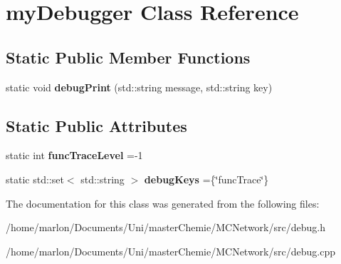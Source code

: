 \hypertarget{classmyDebugger}{}\section{my\+Debugger Class Reference}
\label{classmyDebugger}
\subsection*{Static Public Member Functions}
\begin{DoxyCompactItemize}
\item 
\mbox{\label{classmyDebugger_ac32ad33ccc10846f7cd85881351197b5}} 
static void {\bfseries debug\+Print} (std\+::string message, std\+::string key)
\end{DoxyCompactItemize}
\subsection*{Static Public Attributes}
\begin{DoxyCompactItemize}
\item 
\mbox{\label{classmyDebugger_aa32856ddc22811f9754dc1f14bdbd859}} 
static int {\bfseries func\+Trace\+Level} =-\/1
\item 
\mbox{\label{classmyDebugger_afe246c9eead29364742fd5de3e245655}} 
static std\+::set$<$ std\+::string $>$ {\bfseries debug\+Keys} =\{\char`\"{}func\+Trace\char`\"{}\}
\end{DoxyCompactItemize}


The documentation for this class was generated from the following files\+:\begin{DoxyCompactItemize}
\item 
/home/marlon/\+Documents/\+Uni/master\+Chemie/\+M\+C\+Network/src/debug.\+h\item 
/home/marlon/\+Documents/\+Uni/master\+Chemie/\+M\+C\+Network/src/debug.\+cpp\end{DoxyCompactItemize}
